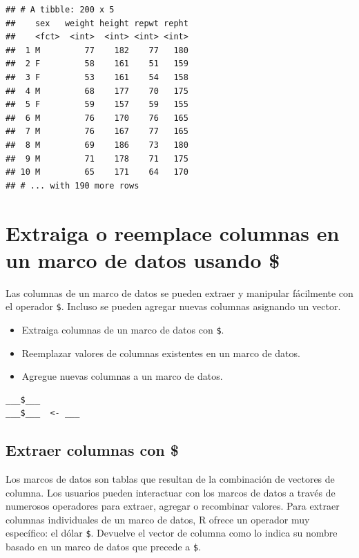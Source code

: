 \documentclass[
]{book}
\providecommand{\tightlist}{%
  \setlength{\itemsep}{0pt}\setlength{\parskip}{0pt}}
\begin{document}
\begin{verbatim}
## # A tibble: 200 x 5
##    sex   weight height repwt repht
##    <fct>  <int>  <int> <int> <int>
##  1 M         77    182    77   180
##  2 F         58    161    51   159
##  3 F         53    161    54   158
##  4 M         68    177    70   175
##  5 F         59    157    59   155
##  6 M         76    170    76   165
##  7 M         76    167    77   165
##  8 M         69    186    73   180
##  9 M         71    178    71   175
## 10 M         65    171    64   170
## # ... with 190 more rows
\end{verbatim}

\hypertarget{extraiga-o-reemplace-columnas-en-un-marco-de-datos-usando}{%
\section{Extraiga o reemplace columnas en un marco de datos usando \$}\label{extraiga-o-reemplace-columnas-en-un-marco-de-datos-usando}}

Las columnas de un marco de datos se pueden extraer y manipular fácilmente con el operador \texttt{\$}. Incluso se pueden agregar nuevas columnas asignando un vector.

\begin{itemize}
\tightlist
\item
  Extraiga columnas de un marco de datos con \texttt{\$}.
\item
  Reemplazar valores de columnas existentes en un marco de datos.
\item
  Agregue nuevas columnas a un marco de datos.
\end{itemize}

\begin{verbatim}
___$___
___$___  <- ___
\end{verbatim}

\hypertarget{extraer-columnas-con}{%
\subsection{Extraer columnas con \$}\label{extraer-columnas-con}}

Los marcos de datos son tablas que resultan de la combinación de vectores de columna. Los usuarios pueden interactuar con los marcos de datos a través de numerosos operadores para extraer, agregar o recombinar valores. Para extraer columnas individuales de un marco de datos, R ofrece un operador muy específico: el dólar \texttt{\$}. Devuelve el vector de columna como lo indica su nombre basado en un marco de datos que precede a \texttt{\$}.
\end{document}
